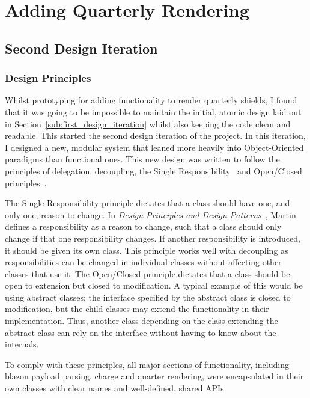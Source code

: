 \documentclass[nobib, a4paper, twoside, justified]{tufte-book}
\makeatletter
\newcommand{\charge}{\gls{charge}\@\xspace}
\newcommand{\quarter}{\gls{quarter}\@\xspace}
\newcommand{\blazon}{\gls{blazon}\@\xspace}
\newcommand{\payload}{\gls{payload}\@\xspace}
\makeatother
\begin{document}
\section{Adding Quarterly Rendering}%
\label{sec:adding_quarterly_rendering}

\subsection{Second Design Iteration}%
\label{sub:second_design_iteration}

\subsubsection{Design Principles}%
\label{ssub:design_principles}

Whilst prototyping for adding functionality to render quarterly shields, I found that it was going
to be impossible to maintain the initial, atomic design laid out in
Section~\ref{sub:first_design_iteration} whilst also keeping the code clean and readable. This started the
second design iteration of the project. In this iteration, I designed a new, modular system that
leaned more heavily into Object-Oriented paradigms than functional ones. This new design was
written to follow the principles of delegation, decoupling, the Single
Responsibility~\autocite{martin2000design} and Open/Closed principles~\autocite{martin2000design}.

The Single Responsibility principle dictates that a class should have one, and only one, reason to
change. In \textit{Design Principles and Design Patterns}~\autocite{martin2000design}, Martin
defines a responsibility as a reason to change, such that a class should only change if that one
responsibility changes. If another responsibility is introduced, it should be given its own class.
This principle works well with decoupling as responsibilities can be changed in individual classes
without affecting other classes that use it. The Open/Closed principle dictates that a class should
be open to extension but closed to modification. A typical example of this would be using abstract
classes; the interface specified by the abstract class is closed to modification, but the child
classes may extend the functionality in their implementation. Thus, another class depending on the
class extending the abstract class can rely on the interface without having to know about the
internals.

To comply with these principles, all major sections of functionality, including \blazon
\payload parsing, \charge and \quarter rendering, were encapsulated in their own classes with clear
names and well-defined, shared APIs.
\end{document}
